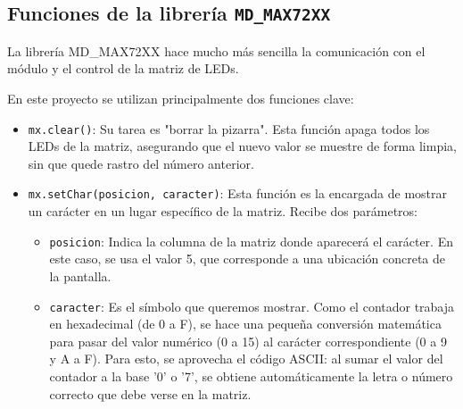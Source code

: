\subsection*{Funciones de la librería \texttt{MD\_MAX72XX}}

La librería MD\_MAX72XX hace mucho más sencilla la comunicación con el módulo y el control de la matriz de LEDs.

En este proyecto se utilizan principalmente dos funciones clave:
\begin{itemize}
    \item \texttt{mx.clear()}: Su tarea es "borrar la pizarra". Esta función apaga todos los LEDs de la matriz, asegurando que el nuevo valor se muestre de forma limpia, sin que quede rastro del número anterior.
    \item \texttt{mx.setChar(posicion, caracter)}: Esta función es la encargada de mostrar un carácter en un lugar específico de la matriz. Recibe dos parámetros:
    \begin{itemize}
        \item \texttt{posicion}: Indica la columna de la matriz donde aparecerá el carácter. En este caso, se usa el valor 5, que corresponde a una ubicación concreta de la pantalla.
        \item \texttt{caracter}: Es el símbolo que queremos mostrar. Como el contador trabaja en hexadecimal (de 0 a F), se hace una pequeña conversión matemática para pasar del valor numérico (0 a 15) al carácter correspondiente (0 a 9 y A a F). Para esto, se aprovecha el código ASCII: al sumar el valor del contador a la base '0' o '7', se obtiene automáticamente la letra o número correcto que debe verse en la matriz.
    \end{itemize}
\end{itemize}
